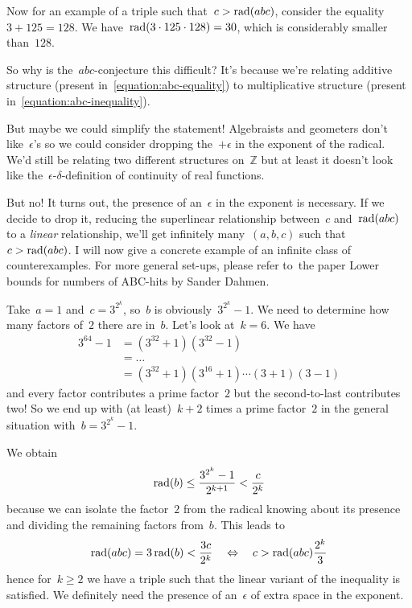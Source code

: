 \begin{example}
  \label{example:abc-2}
  Now for an example of a triple such that~$c>\operatorname{rad}(abc)$, consider the equality~$3+125=128$. We have~$\operatorname{rad}(3\cdot 125\cdot 128)=30$, which is considerably smaller than~$128$.
\end{example}

So why is the~$abc$\nobreakdash-conjecture this difficult? It's because we're relating additive structure (present in~\eqref{equation:abc-equality}) to multiplicative structure (present in~\eqref{equation:abc-inequality}).

But maybe we could simplify the statement! Algebraists and geometers don't like~$\epsilon$'s so we could consider dropping the~$+\epsilon$ in the exponent of the radical. We'd still be relating two different structures on~$\mathbb{Z}$ but at least it doesn't look like the~$\epsilon$-$\delta$-definition of continuity of real functions.

\begin{remark}
  But no! It turns out, the presence of an~$\epsilon$ in the exponent is necessary. If we decide to drop it, reducing the superlinear relationship between~$c$ and~$\operatorname{rad}(abc)$ to a \emph{linear} relationship, we'll get infinitely many~$(a,b,c)$ such that~$c>\operatorname{rad}(abc)$. I will now give a concrete example of an infinite class of counterexamples. For more general set-ups, please refer to~\iftex\cite{lower-bounds-abc-hits}\fi\ifblog the paper Lower bounds for numbers of ABC-hits by Sander Dahmen\fi.
  
  Take~$a=1$ and~$c=3^{2^k}$, so~$b$ is obviously~$3^{2^k}-1$. We need to determine how many factors of~$2$ there are in~$b$. Let's look at~$k=6$. We have
  \begin{equation}
    \begin{aligned}
      3^{64}-1&=(3^{32}+1)(3^{32}-1) \\
      &=\ldots \\
      &=(3^{32}+1)(3^{16}+1)\cdots(3+1)(3-1)
    \end{aligned}
  \end{equation}
  and every factor contributes a prime factor~$2$ but the second-to-last contributes two! So we end up with (at least)~$k+2$ times a prime factor~$2$ in the general situation with~$b=3^{2^k}-1$.
  
  We obtain
  \begin{equation}
    \operatorname{rad}(b)\leq\frac{3^{2^k}-1}{2^{k+1}}<\frac{c}{2^{k}}
  \end{equation}
  because we can isolate the factor~$2$ from the radical knowing about its presence and dividing the remaining factors from~$b$. This leads to
  \begin{equation}
    \operatorname{rad}(abc)=3\operatorname{rad}(b)<\frac{3c}{2^k}\quad\Leftrightarrow\quad c>\operatorname{rad}(abc)\frac{2^k}{3}
  \end{equation}
  hence for~$k\geq 2$ we have a triple such that the linear variant of the inequality is satisfied. We definitely need the presence of an~$\epsilon$ of extra space in the exponent.
\end{remark}

